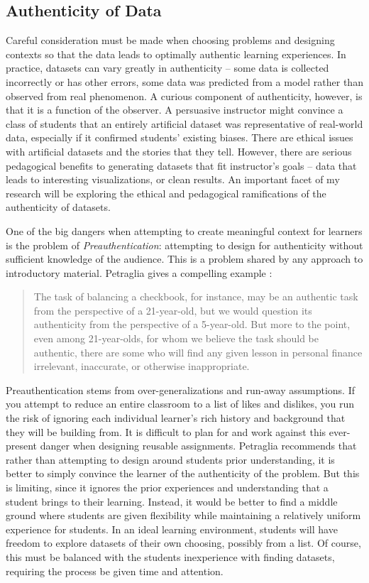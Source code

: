 \subsection{Authenticity of Data}

Careful consideration must be made when choosing problems and designing contexts so that the data leads to optimally authentic learning experiences.
In practice, datasets can vary greatly in authenticity -- some data is collected incorrectly or has other errors, some data was predicted from a model rather than observed from real phenomenon.
A curious component of authenticity, however, is that it is a function of the observer.
A persuasive instructor might convince a class of students that an entirely artificial dataset was representative of real-world data, especially if it confirmed students' existing biases.
There are ethical issues with artificial datasets and the stories that they tell.
However, there are serious pedagogical benefits to generating datasets that fit instructor's goals -- data that leads to interesting visualizations, or clean results.
An important facet of my research will be exploring the ethical and pedagogical ramifications of the authenticity of datasets.

One of the big dangers when attempting to create meaningful context for learners is the problem of \textit{Preauthentication}: attempting to design for authenticity without sufficient knowledge of the audience. This is a problem shared by any approach to introductory material. Petraglia gives a compelling example \cite{preauthentication}:
	
\begin{quotation}
    The task of balancing a checkbook, for instance, may be an authentic task from the perspective of a 21-year-old, but we would question its authenticity from the perspective of a 5-year-old. But more to the point, even among 21-year-olds, for whom we believe the task should be authentic, there are some who will find any given lesson in personal finance irrelevant, inaccurate, or otherwise inappropriate. 
\end{quotation}
Preauthentication stems from over-generalizations and run-away assumptions.
If you attempt to reduce an entire classroom to a list of likes and dislikes, you run the risk of ignoring each individual learner's rich history and background that they will be building from. 
It is difficult to plan for and work against this ever-present danger when designing reusable assignments. 
Petraglia \cite{preauthentication} recommends that rather than attempting to design around students prior understanding, it is better to simply convince the learner of the authenticity of the problem.
But this is limiting, since it ignores the prior experiences and understanding that a student brings to their learning.
Instead, it would be better to find a middle ground where students are given flexibility while maintaining a relatively uniform experience for students.
In an ideal learning environment, students will have freedom to explore datasets of their own choosing, possibly from a list.
Of course, this must be balanced with the students inexperience with finding datasets, requiring the process be given time and attention.